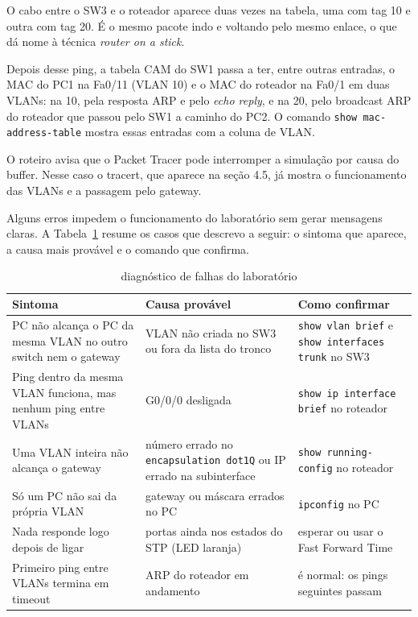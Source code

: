 O cabo entre o SW3 e o roteador aparece duas vezes na tabela, uma com tag 10 e outra com tag 20. É o mesmo pacote indo e voltando pelo mesmo enlace, o que dá nome à técnica \emph{router on a stick}.

Depois desse ping, a tabela CAM do SW1 passa a ter, entre outras entradas, o MAC do PC1 na Fa0/11 (VLAN 10) e o MAC do roteador na Fa0/1 em duas VLANs: na 10, pela resposta ARP e pelo \emph{echo reply}, e na 20, pelo broadcast ARP do roteador que passou pelo SW1 a caminho do PC2. O comando \texttt{show mac-address-table} mostra essas entradas com a coluna de VLAN.

O roteiro avisa que o Packet Tracer pode interromper a simulação por causa do buffer. Nesse caso o tracert, que aparece na seção 4.5, já mostra o funcionamento das VLANs e a passagem pelo gateway.


Alguns erros impedem o funcionamento do laboratório sem gerar mensagens claras. A Tabela~\ref{tab:diagnostico} resume os casos que descrevo a seguir: o sintoma que aparece, a causa mais provável e o comando que confirma.

\begin{table}[tbp]
\caption{diagnóstico de falhas do laboratório}\label{tab:diagnostico}
\footnotesize\renewcommand{\arraystretch}{1.18}
\begin{tabularx}{\textwidth}{@{}>{\raggedright\arraybackslash}X>{\raggedright\arraybackslash}X>{\raggedright\arraybackslash}p{3.9cm}@{}}
\toprule
\textbf{Sintoma} & \textbf{Causa provável} & \textbf{Como confirmar}\\
\midrule
PC não alcança o PC da mesma VLAN no outro switch nem o gateway & VLAN não criada no SW3 ou fora da lista do tronco & \texttt{show vlan brief} e \texttt{show interfaces trunk} no SW3\\
Ping dentro da mesma VLAN funciona, mas nenhum ping entre VLANs & G0/0/0 desligada & \texttt{show ip interface brief} no roteador\\
Uma VLAN inteira não alcança o gateway & número errado no \texttt{encapsulation dot1Q} ou IP errado na subinterface & \texttt{show running-config} no roteador\\
Só um PC não sai da própria VLAN & gateway ou máscara errados no PC & \texttt{ipconfig} no PC\\
Nada responde logo depois de ligar & portas ainda nos estados do STP (LED laranja) & esperar ou usar o Fast Forward Time\\
Primeiro ping entre VLANs termina em timeout & ARP do roteador em andamento & é normal: os pings seguintes passam\\
\bottomrule
\end{tabularx}
\end{table}

